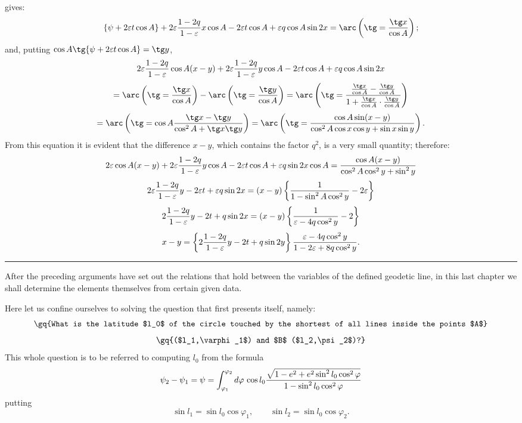 \begingroup\small
gives:
\[
 \{\psi+2\varepsilon t\cos A\}+2\varepsilon{1-2q\over1-\varepsilon}x\cos A-2\varepsilon t\cos A
 +\varepsilon q\cos A\sin2x
 =\arc\left(\tg={\tg x\over\cos A}\right);
\]
and, putting $\cos A\tg\{\psi+2\varepsilon t\cos A\}=\tg y$,
\[
 2\varepsilon{1-2q\over1-\varepsilon}\cos A(x-y)+2\varepsilon{1-2q\over1-\varepsilon}y\cos A-2\varepsilon t\cos A+\varepsilon q\cos A\sin2x
\]
\[
=\arc\left(\tg={\tg x\over\cos A}\right)-\arc\left(\tg={\tg y\over\cos A}\right)
=\arc\left(\tg={ {\tg x\over\cos A}-{\tg y\over\cos A}\over 1+{\tg x\over\cos A}\cdot{\tg y\over\cos A}}\right)
\]
\[
=\arc\left(\tg=\cos A{\tg x-\tg y\over \cos^2 A+\tg x\tg y}\right)
=\arc\left(\tg={\cos A\sin(x-y)\over \cos^2A\cos x\cos y+\sin x\sin y}\right).
\]
From this equation it is evident that the difference $x-y$, which contains the factor $q^2$, is a very small quantity; therefore:
\[
2\varepsilon\cos A(x-y)+2\varepsilon{1-2q\over1-\varepsilon}y\cos A-2\varepsilon t\cos A+\varepsilon q\sin2x\cos A
={\cos A(x-y)\over \cos^2A\cos^2y+\sin^2y}
\]
\[
2\varepsilon{1-2q\over1-\varepsilon}y-2\varepsilon t+\varepsilon q\sin2x
=(x-y)\left\{{1\over1-\sin^2A\cos^2y}-2\varepsilon\right\}
\]
\[
2{1-2q\over1-\varepsilon}y-2t+q\sin2x
=(x-y)\left\{{1\over\varepsilon-4q\cos^2y}-2\right\}
\]
\[
 x-y=\left\{2{1-2q\over1-\varepsilon}y-2t+q\sin2y\right\}{\varepsilon-4q\cos^2y\over1-2\varepsilon+8q\cos^2y}.
\]

\rule{0.35\textwidth}{0.4pt}


After the preceding arguments have set out the relations that hold between the variables of the defined geodetic line, in this last chapter we shall determine the elements themselves from certain given data.

Here let us confine ourselves to solving the question that first presents itself, namely:
\[
\text{\gq{What is the latitude $l_0$ of the circle touched by the shortest of all lines inside the points $A$}}
\]
\[
\text{\gq{($l_1,\varphi_1$) and $B$ ($l_2,\psi_2$)?}}
\]
This whole question is to be referred to computing $l_0$ from the formula
\[
 \psi_2-\psi_1=\psi=\int_{\varphi_1}^{\varphi_2} d\varphi\,\cos l_0
{\sqrt{1-e^2+e^2\sin^2 l_0\cos^2\varphi}\over1-\sin^2 l_0\cos^2\varphi}
\]
putting
\[
 \sin l_1=\sin l_0\cos\varphi_1,
 \qquad
 \sin l_2=\sin l_0\cos\varphi_2.
\]
\endgroup
